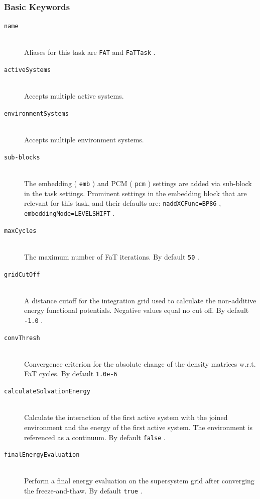 \documentclass[bibliography=totocnumbered,a4paper,10pt,oneside]{scrbook}
\newcommand{\ttt}[1]{%
  \begingroup\setlength{\fboxsep}{1pt}%
  \colorbox{serenity-green!30}{\texttt{\hspace*{2pt}\vphantom{(g}#1\hspace*{2pt}}}%
  \endgroup
}
\begin{document}
\subsubsection{Basic Keywords}
\begin{description}
	\item [\texttt{name}]\hfill \\
	Aliases for this task are \ttt{FAT} and \ttt{FaTTask}.
	\item [\texttt{activeSystems}]\hfill \\
	Accepts multiple active systems.
	\item [\texttt{environmentSystems}]\hfill \\
	Accepts multiple environment systems.
	\item [\texttt{sub-blocks}]\hfill \\
	The embedding (\ttt{emb}) and PCM (\ttt{pcm}) settings are added via sub-block in the task settings.
	Prominent settings in the embedding block that are relevant for this task, and their defaults are:
	\ttt{naddXCFunc=BP86}, \ttt{embeddingMode=LEVELSHIFT}.
	\item [\texttt{maxCycles}]\hfill \\
	The maximum number of FaT iterations. By default \ttt{50}.
	\item [\texttt{gridCutOff}]\hfill \\
	A distance cutoff for the integration grid used to calculate the non-additive  energy functional potentials. Negative values equal no cut off. By default \ttt{-1.0}.
	\item [\texttt{convThresh}]\hfill \\
	Convergence criterion for the absolute change of the density matrices w.r.t. FaT cycles. By default \ttt{1.0e-6}
	\item [\texttt{calculateSolvationEnergy}]\hfill \\
	Calculate the interaction of the first active system with the joined environment and the energy of the first active system. The environment is referenced as a continuum. By default \ttt{false}.
	\item [\texttt{finalEnergyEvaluation}]\hfill \\
	Perform a final energy evaluation on the supersystem grid after converging the freeze-and-thaw. By default \ttt{true}.
\end{description}
\end{document}
